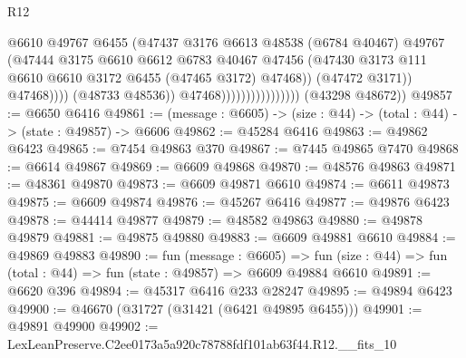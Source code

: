 \begin{lexlean}{R12}
\begin{coremodule}
                                                @6610
                                                @49767
                                                @6455
                                                (@47437
                                                  @3176
                                                  @6613
                                                  @48538
                                                  (@6784 @40467)
                                                  @49767
                                                  (@47444
                                                    @3175
                                                    @6610
                                                    @6612
                                                    @6783
                                                    @40467
                                                    @47456
                                                    (@47430
                                                      @3173
                                                      @111
                                                      @6610
                                                      @6610
                                                      @3172
                                                      @6455
                                                      (@47465 @3172)
                                                      @47468))
                                                  (@47472 @3171))
                                                @47468))))
                                        (@48733 @48536))
                                      @47468))))))))))))))))
      (@43298 @48672))
@49857 := @6650 @6416
@49861 := (message : @6605) -> (size : @44) -> (total : @44) -> (state : @49857) -> @6606
@49862 := @45284 @6416
@49863 := @49862 @6423
@49865 := @7454 @49863 @370
@49867 := @7445 @49865 @7470
@49868 := @6614 @49867
@49869 := @6609 @49868
@49870 := @48576 @49863
@49871 := @48361 @49870
@49873 := @6609 @49871 @6610
@49874 := @6611 @49873
@49875 := @6609 @49874
@49876 := @45267 @6416
@49877 := @49876 @6423
@49878 := @44414 @49877
@49879 := @48582 @49863
@49880 := @49878 @49879
@49881 := @49875 @49880
@49883 := @6609 @49881 @6610
@49884 := @49869 @49883
@49890 := fun (message : @6605) =>
  fun (size : @44) => fun (total : @44) => fun (state : @49857) => @6609 @49884 @6610
@49891 := @6620 @396
@49894 := @45317 @6416 @233 @28247
@49895 := @49894 @6423
@49900 := @46670 (@31727 (@31421 (@6421 @49895 @6455)))
@49901 := @49891 @49900
@49902 := LexLeanPreserve.C2ee0173a5a920c78788fdf101ab63f44.R12.__fits_10

\end{coremodule}
\end{lexlean}
